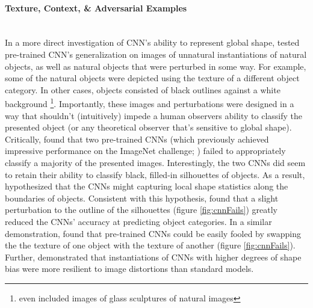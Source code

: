 \documentclass[12pt]{article}
\let\oldcite=\cite
\let\oldtextcite=\textcite
\renewcommand{\cite}[1]{\textcolor[rgb]{0, .121, .388}{\oldcite{#1}}}
\renewcommand{\textcite}[1]{\textcolor[rgb]{0, .121, .388}{\oldtextcite{#1}}}
\begin{document}
\paragraph{Texture, Context, \& Adversarial Examples}\mbox{} \\

In a more direct investigation of CNN's ability to represent global shape, \textcite{baker2018deep} tested pre-trained CNN's generalization on images of unnatural instantiations of natural objects, as well as natural objects that were perturbed in some way. For example, some of the natural objects were depicted using the texture of a different object category. In other cases, objects consisted of black outlines against a white background \footnote{\textcite{baker2018deep} even included images of glass sculptures of natural images}. Importantly, these images and perturbations were designed in a way that shouldn't (intuitively) impede a human observers ability to classify the presented object (or any theoretical observer that's sensitive to global shape). Critically, \textcite{baker2018deep} found that two pre-trained CNNs (which previously achieved impressive performance on the ImageNet challenge; \cite{deng2009imagenet}) failed to appropriately classify a majority of the presented images. Interestingly, the two CNNs did seem to retain their ability to classify black, filled-in silhouettes of objects. As a result, \textcite{baker2018deep} hypothesized that the CNNs might capturing local shape statistics along the boundaries of objects. Consistent with this hypothesis, \textcite{baker2018deep} found that a slight perturbation to the outline of the silhouettes (figure \ref{fig:cnnFails}) greatly reduced the CNNs' accuracy at predicting object categories. In a similar demonstration, \textcite{geirhos2018imagenet} found that pre-trained CNNs could be easily fooled by swapping the the texture of one object with the texture of another (figure \ref{fig:cnnFails}). Further, \textcite{geirhos2018imagenet} demonstrated that instantiations of CNNs with higher degrees of shape bias were more resilient to image distortions than standard models.
\end{document}

